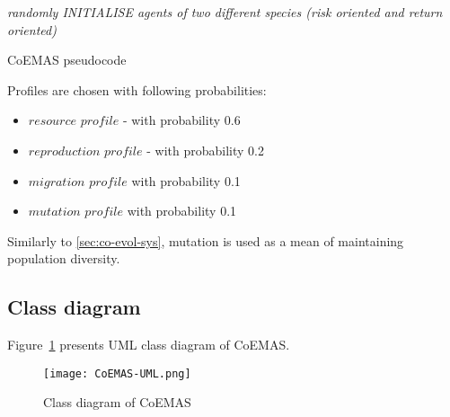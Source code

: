 \begin{algorithm}
 
  \BlankLine
  \emph{randomly INITIALISE agents of two different species (risk oriented and return oriented)}\;
  \caption{CoEMAS pseudocode}\label{coemas_pseudo}
\end{algorithm}


Profiles are chosen with following probabilities:
\begin{itemize}
  \item $resource$ $profile$ - with probability 0.6
  \item $reproduction$ $profile$ - with probability 0.2
  \item $migration$ $profile$ with probability 0.1
  \item $mutation$ $profile$ with probability 0.1
\end{itemize}

Similarly to \ref{sec:co-evol-sys}, mutation is used as a mean of maintaining population diversity.


\subsection{Class diagram}
\label{CoEMAS-class-diagram}

Figure~\ref{fig:coemas-uml} presents UML class diagram of CoEMAS.

\begin{figure}[ht]   
	    \begin{center}
	      \texttt{[image: CoEMAS-UML.png]}
	    \end{center}
	    \caption{Class diagram of CoEMAS} 
	    \label{fig:coemas-uml}
	  \end{figure}

